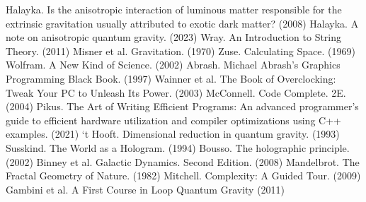\documentclass[12pt]{article}
\begin{document}
\pagebreak







\begin{thebibliography}{9}

 Halayka. Is the anisotropic interaction of luminous matter responsible for the extrinsic gravitation usually attributed to exotic dark matter? (2008)
 Halayka. A note on anisotropic quantum gravity. (2023)
 Wray. An Introduction to String Theory. (2011)
 Misner et al. Gravitation. (1970)
 Zuse. Calculating Space. (1969)
 Wolfram. A New Kind of Science. (2002)
 Abrash. Michael Abrash's Graphics Programming Black Book. (1997)
 Wainner et al. The Book of Overclocking: Tweak Your PC to Unleash Its Power. (2003)
 McConnell. Code Complete. 2E. (2004)
 Pikus. The Art of Writing Efficient Programs: An advanced programmer's guide to efficient hardware utilization and compiler optimizations using C++ examples. (2021)
 `t Hooft. Dimensional reduction in quantum gravity. (1993)
 Susskind. The World as a Hologram. (1994)
 Bousso. The holographic principle. (2002)
 Binney et al. Galactic Dynamics. Second Edition. (2008)
 Mandelbrot. The Fractal Geometry of Nature. (1982)
 Mitchell. Complexity: A Guided Tour. (2009)
 Gambini et al. A First Course in Loop Quantum Gravity (2011)








\end{thebibliography}
\end{document}
